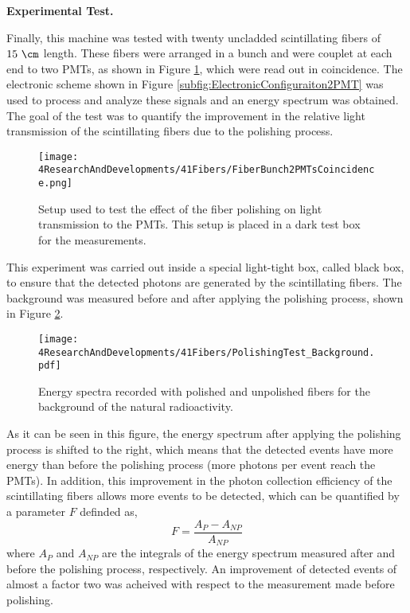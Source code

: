 \textbf{Experimental Test.}

Finally, this machine was tested with twenty uncladded scintillating fibers of $15~\cm$ length. These fibers were arranged in a bunch and were couplet at each end to two PMTs, as shown in Figure \ref{fig:BunchWith2PMTsCoincidence}, which were read out in coincidence. The electronic scheme shown in Figure \ref{subfig:ElectronicConfiguraiton2PMT} was used to process and analyze these signals and an energy spectrum was obtained. The goal of the test was to quantify the improvement in the relative light transmission of the scintillating fibers due to the polishing process.

\begin{figure}[]
\centering
\texttt{[image: 4ResearchAndDevelopments/41Fibers/FiberBunch2PMTsCoincidence.png]}
\caption{Setup used to test the effect of the fiber polishing on light transmission to the PMTs. This setup is placed in a dark test box for the measurements.\label{fig:BunchWith2PMTsCoincidence}}
\end{figure}

This experiment was carried out inside a special light-tight box, called black box, to ensure that the detected photons are generated by the scintillating fibers. The background was measured before and after applying the polishing process, shown in Figure \ref{fig:ResultsOfPolishingMachineBackground}.

\begin{figure}[]
\centering
\texttt{[image: 4ResearchAndDevelopments/41Fibers/PolishingTest\_Background.pdf]}
\caption{Energy spectra recorded with polished and unpolished fibers for the background of the natural radioactivity.\label{fig:ResultsOfPolishingMachineBackground}}
\end{figure}

As it can be seen in this figure, the energy spectrum after applying the polishing process is shifted to the right, which means that the detected events have more energy than before the polishing process (more photons per event reach the PMTs). In addition, this improvement in the photon collection efficiency of the scintillating fibers allows more events to be detected, which can be quantified by a parameter $F$ definded as,
\begin{equation}
F=\frac{A_{P}-A_{NP}}{A_{NP}}
\label{eq:RelativeImprovement}
\end{equation}
where $A_{P}$ and $A_{NP}$ are the integrals of the energy spectrum measured after and before the polishing process, respectively. An improvement of detected events of almost a factor two was acheived with respect to the measurement made before polishing.

